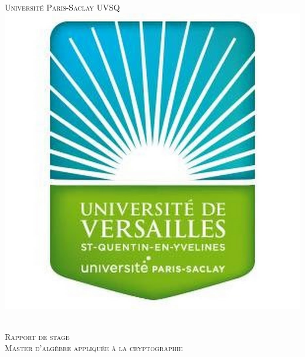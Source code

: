 \documentclass[11pt, headsepline, a4paper, fleqn, oneside]{article}
\begin{document}
\begin{titlepage}

\newcommand{\HRule}{\rule{\linewidth}{1mm}} %

\center 
 

\begin{minipage}{1\textwidth}
\centering
\textsc{\LARGE Université Paris-Saclay UVSQ}\\[0.5cm] 
\includegraphics[scale=0.13]{versailles.jpg} 
\end{minipage}
\\[1.5cm]
\textsc{\Large Rapport de stage }\\[0.5cm] %
\textsc{\large Master d'algèbre appliquée à la cryptographie}\\[0.5cm] %



\end{titlepage}
\end{document}
